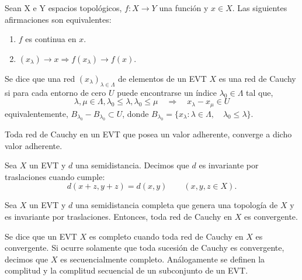 \begin{proposicion}
Sean X e Y espacios topológicos, $f: X \rightarrow Y$ una función y $x\in X$. Las siguientes afirmaciones son equivalentes:
\begin{enumerate}
	\item $f$ es continua en $x$.
	\item $(x_{\lambda}) \rightarrow x \Rightarrow f(x_{\lambda}) \rightarrow f(x)$.
\end{enumerate}
\end{proposicion}

\begin{definicion}
Se dice que una red $(x_{\lambda})_{\lambda\in\Lambda}$ de elementos de un EVT $X$ es una red de Cauchy si para cada entorno de cero $U$ puede encontrarse un índice $\lambda_{0}\in\Lambda$ tal que,
\begin{equation}
\lambda, \mu \in \Lambda, \lambda_{0}\leq\lambda, \lambda_{0}\leq\mu \quad \Rightarrow \quad x_{\lambda}-x_{\mu}\in U
\end{equation}
equivalentemente, $B_{\lambda_{0}}-B_{\lambda_{0}} \subset U$, donde $B_{\lambda_{0}} = \{ x_{\lambda} : \lambda\in\Lambda,\quad \lambda_{0}\leq\lambda \}.$
\end{definicion}

\begin{lema}
Toda red de Cauchy en un EVT que posea un valor adherente, converge a dicho valor adherente.
\end{lema}

\begin{definicion}
Sea $X$ un EVT y $d$ una semidistancia. Decimos que $d$ es invariante por traslaciones cuando cumple:
\begin{equation}
d(x+z, y+z) = d(x,y) \qquad (x,y,z\in X).
\end{equation}

\end{definicion}

\begin{proposicion}
Sea $X$ un EVT y $d$ una semidistancia completa que genera una topología de $X$ y es invariante por traslaciones. Entonces, toda red de Cauchy en $X$ es convergente. 
\end{proposicion}

\begin{definicion} \label{def:d01}
Se dice que un EVT $X$ es completo cuando toda red de Cauchy en $X$ es convergente. Si ocurre solamente que toda sucesión de Cauchy es convergente, decimos que $X$ es secuencialmente completo. Análogamente se definen la complitud y la complitud secuencial de un subconjunto de un EVT.
\end{definicion}

